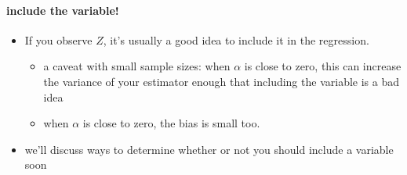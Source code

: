 \paragraph{include the variable!}
\begin{itemize}
\item If you observe $Z$, it's usually a good idea to include it
          in the regression.
\begin{itemize}
\item a caveat with small sample sizes: when $α$ is close
            to zero, this can increase the variance of your estimator
            enough that including the variable is a bad idea
\item when $α$ is close to zero, the bias is small too.
\end{itemize}
\item we'll discuss ways to determine whether or not you should
          include a variable soon
\end{itemize}

